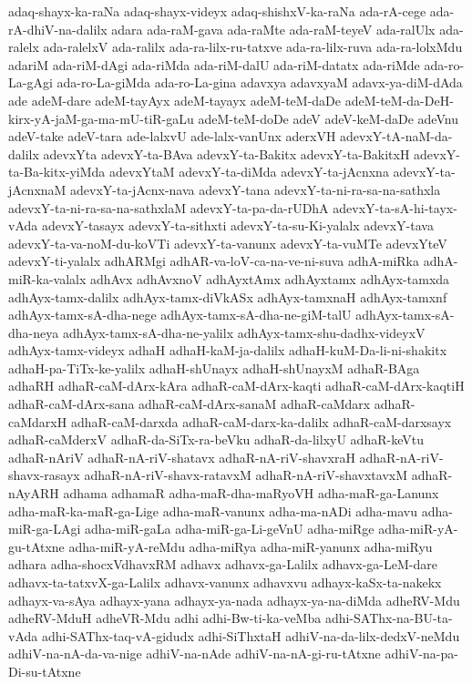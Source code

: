 {adaq-shayx-ka-raNa
adaq-shayx-videyx
adaq-shishxV-ka-raNa
ada-rA-cege
ada-rA-dhiV-na-dalilx
adara
ada-raM-gava
ada-raMte
ada-raM-teyeV
ada-ralUlx
ada-ralelx
ada-ralelxV
ada-ralilx
ada-ra-lilx-ru-tatxve
ada-ra-lilx-ruva
ada-ra-lolxMdu
adariM
ada-riM-dAgi
ada-riMda
ada-riM-dalU
ada-riM-datatx
ada-riMde
ada-ro-La-gAgi
ada-ro-La-giMda
ada-ro-La-gina
adavxya
adavxyaM
adavx-ya-diM-dAda
ade
adeM-dare
adeM-tayAyx
adeM-tayayx
adeM-teM-daDe
adeM-teM-da-DeH-kirx-yA-jaM-ga-ma-mU-tiR-gaLu
adeM-teM-doDe
adeV
adeV-keM-daDe
adeVnu
adeV-take
adeV-tara
ade-lalxvU
ade-lalx-vanUnx
aderxVH
adevxY-tA-naM-da-dalilx
adevxYta
adevxY-ta-BAva
adevxY-ta-Bakitx
adevxY-ta-BakitxH
adevxY-ta-Ba-kitx-yiMda
adevxYtaM
adevxY-ta-diMda
adevxY-ta-jAcnxna
adevxY-ta-jAcnxnaM
adevxY-ta-jAcnx-nava
adevxY-tana
adevxY-ta-ni-ra-sa-na-sathxla
adevxY-ta-ni-ra-sa-na-sathxlaM
adevxY-ta-pa-da-rUDhA
adevxY-ta-sA-hi-tayx-vAda
adevxY-tasayx
adevxY-ta-sithxti
adevxY-ta-su-Ki-yalalx
adevxY-tava
adevxY-ta-va-noM-du-koVTi
adevxY-ta-vanunx
adevxY-ta-vuMTe
adevxYteV
adevxY-ti-yalalx
adhARMgi
adhAR-va-loV-ca-na-ve-ni-suva
adhA-miRka
adhA-miR-ka-valalx
adhAvx
adhAvxnoV
adhAyxtAmx
adhAyxtamx
adhAyx-tamxda
adhAyx-tamx-dalilx
adhAyx-tamx-diVkASx
adhAyx-tamxnaH
adhAyx-tamxnf
adhAyx-tamx-sA-dha-nege
adhAyx-tamx-sA-dha-ne-giM-talU
adhAyx-tamx-sA-dha-neya
adhAyx-tamx-sA-dha-ne-yalilx
adhAyx-tamx-shu-dadhx-videyxV
adhAyx-tamx-videyx
adhaH
adhaH-kaM-ja-dalilx
adhaH-kuM-Da-li-ni-shakitx
adhaH-pa-TiTx-ke-yalilx
adhaH-shUnayx
adhaH-shUnayxM
adhaR-BAga
adhaRH
adhaR-caM-dArx-kAra
adhaR-caM-dArx-kaqti
adhaR-caM-dArx-kaqtiH
adhaR-caM-dArx-sana
adhaR-caM-dArx-sanaM
adhaR-caMdarx
adhaR-caMdarxH
adhaR-caM-darxda
adhaR-caM-darx-ka-dalilx
adhaR-caM-darxsayx
adhaR-caMderxV
adhaR-da-SiTx-ra-beVku
adhaR-da-lilxyU
adhaR-keVtu
adhaR-nAriV
adhaR-nA-riV-shatavx
adhaR-nA-riV-shavxraH
adhaR-nA-riV-shavx-rasayx
adhaR-nA-riV-shavx-ratavxM
adhaR-nA-riV-shavxtavxM
adhaR-nAyARH
adhama
adhamaR
adha-maR-dha-maRyoVH
adha-maR-ga-Lanunx
adha-maR-ka-maR-ga-Lige
adha-maR-vanunx
adha-ma-nADi
adha-mavu
adha-miR-ga-LAgi
adha-miR-gaLa
adha-miR-ga-Li-geVnU
adha-miRge
adha-miR-yA-gu-tAtxne
adha-miR-yA-reMdu
adha-miRya
adha-miR-yanunx
adha-miRyu
adhara
adha-shocxVdhavxRM
adhavx
adhavx-ga-Lalilx
adhavx-ga-LeM-dare
adhavx-ta-tatxvX-ga-Lalilx
adhavx-vanunx
adhavxvu
adhayx-kaSx-ta-nakekx
adhayx-va-sAya
adhayx-yana
adhayx-ya-nada
adhayx-ya-na-diMda
adheRV-Mdu
adheRV-MduH
adheVR-Mdu
adhi
adhi-Bw-ti-ka-veMba
adhi-SAThx-na-BU-ta-vAda
adhi-SAThx-taq-vA-gidudx
adhi-SiThxtaH
adhiV-na-da-lilx-dedxV-neMdu
adhiV-na-nA-da-va-nige
adhiV-na-nAde
adhiV-na-nA-gi-ru-tAtxne
adhiV-na-pa-Di-su-tAtxne
}
